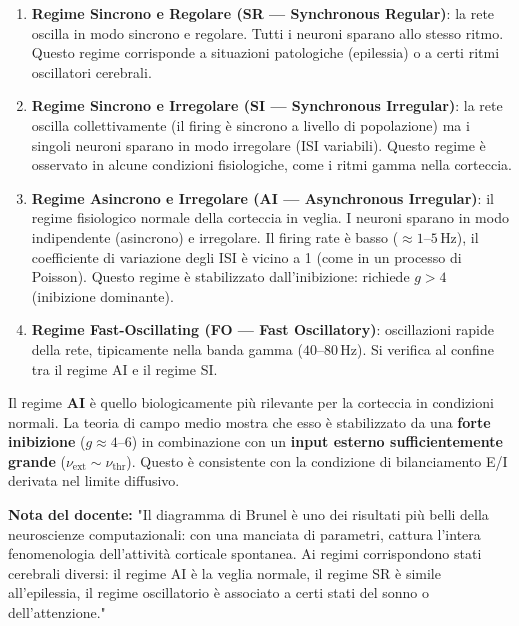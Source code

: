 \begin{enumerate}
    \item \textbf{Regime Sincrono e Regolare (SR — Synchronous Regular)}: la rete oscilla in modo sincrono e regolare. Tutti i neuroni sparano allo stesso ritmo. Questo regime corrisponde a situazioni patologiche (epilessia) o a certi ritmi oscillatori cerebrali.
    \item \textbf{Regime Sincrono e Irregolare (SI — Synchronous Irregular)}: la rete oscilla collettivamente (il firing è sincrono a livello di popolazione) ma i singoli neuroni sparano in modo irregolare (ISI variabili). Questo regime è osservato in alcune condizioni fisiologiche, come i ritmi gamma nella corteccia.
    \item \textbf{Regime Asincrono e Irregolare (AI — Asynchronous Irregular)}: il regime fisiologico normale della corteccia in veglia. I neuroni sparano in modo indipendente (asincrono) e irregolare. Il firing rate è basso ($\approx 1$–$5\,\text{Hz}$), il coefficiente di variazione degli ISI è vicino a 1 (come in un processo di Poisson). Questo regime è stabilizzato dall'inibizione: richiede $g > 4$ (inibizione dominante).
    \item \textbf{Regime Fast-Oscillating (FO — Fast Oscillatory)}: oscillazioni rapide della rete, tipicamente nella banda gamma ($40$–$80\,\text{Hz}$). Si verifica al confine tra il regime AI e il regime SI.
\end{enumerate}

Il regime \textbf{AI} è quello biologicamente più rilevante per la corteccia in condizioni normali. La teoria di campo medio mostra che esso è stabilizzato da una \textbf{forte inibizione} ($g \approx 4$–$6$) in combinazione con un \textbf{input esterno sufficientemente grande} ($\nu_{\text{ext}} \sim \nu_{\text{thr}}$). Questo è consistente con la condizione di bilanciamento E/I derivata nel limite diffusivo.

\begin{tcolorbox}[colback=gray!5, colframe=gray!40, arc=2mm, boxrule=0.5pt]
\textbf{Nota del docente:} "Il diagramma di Brunel è uno dei risultati più belli della neuroscienze computazionali: con una manciata di parametri, cattura l'intera fenomenologia dell'attività corticale spontanea. Ai regimi corrispondono stati cerebrali diversi: il regime AI è la veglia normale, il regime SR è simile all'epilessia, il regime oscillatorio è associato a certi stati del sonno o dell'attenzione."
\end{tcolorbox}

